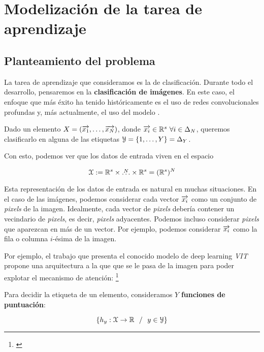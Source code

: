 \chapter{Modelización de la tarea de aprendizaje} \label{ch:tarea_aprendizaje}

\section{Planteamiento del problema} \label{seq:planteamiento_problema}

La tarea de aprendizaje que consideramos es la de clasificación. Durante todo el desarrollo, pensaremos en la \textbf{clasificación de imágenes}. En este caso, el enfoque que más éxito ha tenido históricamente es el uso de redes convolucionales profundas y, más actualmente, el uso del modelo .

Dado un elemento $X = (\overrightarrow{x_1}, \ldots, \overrightarrow{x_N})$, donde $\nv{x_i} \in \R^s \ \forall i \in \deltaset{N}$, queremos clasificarlo en alguna de las etiquetas $\mathcal{Y} = \{1, \ldots, Y \} = \Delta_{Y}$.

Con esto, podemos ver que los datos de entrada viven en el espacio

$$\mathcal{X} := \mathbb{R}^s \times \overset{N}{\ldots} \times \mathbb{R}^s = (\mathbb{R}^s)^N$$

Esta representación de los datos de entrada es natural en muchas situaciones. En el caso de las imágenes, podemos considerar cada vector $\overrightarrow{x_i}$ como un conjunto de \textit{pixels} de la imagen. Idealmente, cada vector de \textit{pixels} debería contener un vecindario de \textit{pixels}, es decir, \textit{pixels} adyacentes. Podemos incluso considerar \textit{pixels} que aparezcan en más de un vector. Por ejemplo, podemos considerar $\overrightarrow{x_i}$ como la fila o columna $i$-ésima de la imagen.

Por ejemplo, el trabajo que presenta el conocido modelo  de deep learning \textit{VIT} propone una arquitectura  a la que que se le pasa  de la imagen para poder explotar el mecanismo de atención:  \footnote{\cite{matematicas:vit}}

Para decidir la etiqueta de un elemento, consideramos $Y$ \textbf{funciones de puntuación}:

$$\{h_y: \mathcal{X} \to \mathbb{R} \ \  / \ \  y \in \mathcal{Y} \}$$

